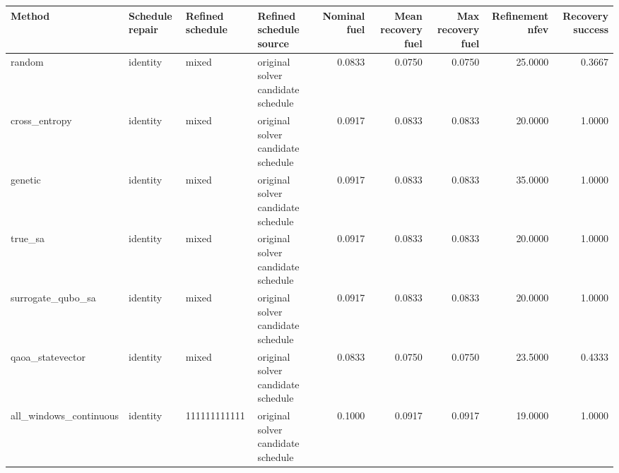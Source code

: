 \begin{tabular}{llllrrrrr}
\toprule
Method & Schedule repair & Refined schedule & Refined schedule source & Nominal fuel & Mean recovery fuel & Max recovery fuel & Refinement nfev & Recovery success \\
\midrule
random & identity & mixed & original solver candidate schedule & 0.0833 & 0.0750 & 0.0750 & 25.0000 & 0.3667 \\
cross\_entropy & identity & mixed & original solver candidate schedule & 0.0917 & 0.0833 & 0.0833 & 20.0000 & 1.0000 \\
genetic & identity & mixed & original solver candidate schedule & 0.0917 & 0.0833 & 0.0833 & 35.0000 & 1.0000 \\
true\_sa & identity & mixed & original solver candidate schedule & 0.0917 & 0.0833 & 0.0833 & 20.0000 & 1.0000 \\
surrogate\_qubo\_sa & identity & mixed & original solver candidate schedule & 0.0917 & 0.0833 & 0.0833 & 20.0000 & 1.0000 \\
qaoa\_statevector & identity & mixed & original solver candidate schedule & 0.0833 & 0.0750 & 0.0750 & 23.5000 & 0.4333 \\
all\_windows\_continuous & identity & 111111111111 & original solver candidate schedule & 0.1000 & 0.0917 & 0.0917 & 19.0000 & 1.0000 \\
\bottomrule
\end{tabular}
